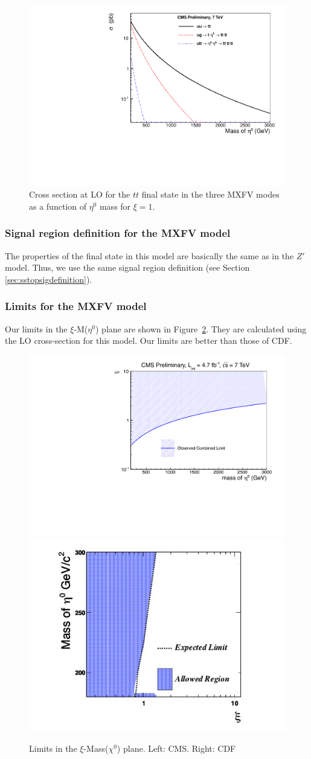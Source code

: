 \begin{figure}[htb]
\begin{center}
\includegraphics[width=0.55\linewidth]{figs/mxvxsec.pdf}
\caption{Cross section at LO for the $tt$ final state in the three MXFV modes
as a function of $\eta^0$ mass for $\xi = 1$.
\label{fig:mxvxsec}}
\end{center}
\end{figure}

\subsubsection{Signal region definition for the MXFV model}
\label{sec:mxfvdefinition}
The properties of the final state in this model are basically the same as in the $Z'$ model.
Thus, we use the same signal region definition (see Section \ref{sec:sstopsigdefinition}).


\subsubsection{Limits for the MXFV model}
\label{sec:mxfvlimits}
Our limits in the $\xi$-M($\eta^0$) plane are shown in 
Figure~\ref{fig:MxVExcl}.
They are calculated using the LO cross-section for this model.
Our limits are better than those of CDF\cite{mxflv3}.

\begin{figure}[htb]
\begin{center}
\includegraphics[width=0.45\linewidth]{figs/MxVExclCombined.pdf}
\includegraphics[width=0.45\linewidth]{figs/CDFlimit.png}
\caption{Limits in the $\xi$-Mass($\chi^0$) plane.  Left: CMS.  Right: CDF
\label{fig:MxVExcl}}
\end{center}
\end{figure}

